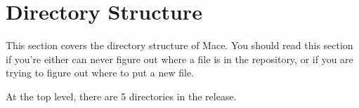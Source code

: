 % 
% 
% 
% 
% 
% 
\appendix

\section{Directory Structure}
\label{sec:dir-struct}

This section covers the directory structure of Mace.  You should read this section
if you're either can never figure out where a file is in the repository, or if you are
trying to figure out where to put a new file.

At the top level, there are 5 directories in the release.

